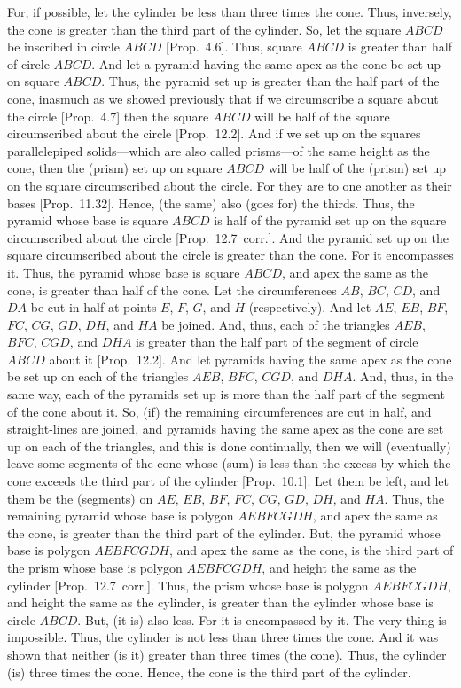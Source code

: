 \begin{Parallel}{}{}
{For, if possible, let the cylinder be less than three times the cone. Thus, inversely, the cone is greater than the third
part of the cylinder. So, let the square $ABCD$ be inscribed in circle $ABCD$  [Prop.~4.6]. Thus, square $ABCD$ is greater
than half of circle $ABCD$. 
And let a pyramid having the same apex as the cone be set up on square  $ABCD$. Thus, the pyramid set up
is greater than the half part of the cone, inasmuch as we showed previously that if we circumscribe a square
about the circle [Prop.~4.7] then the square $ABCD$ will be half of the square circumscribed about the circle [Prop.~12.2]. And if we set up   on the squares parallelepiped solids---which are also
called prisms---of the same height as the cone, then the (prism) set up on square $ABCD$ will be half of the (prism) set up on the square circumscribed
about the circle. For they are to one another as their bases [Prop.~11.32]. Hence, (the same) also (goes for) the thirds.  Thus, the pyramid whose base is square $ABCD$ is half of the pyramid set up on the square
circumscribed about the circle [Prop.~12.7~corr.]. And the pyramid set up on the square
circumscribed about the circle is greater than the cone. For it encompasses it. Thus, the pyramid whose
base is square $ABCD$, and apex the same as the cone, is greater than half of the cone. Let the circumferences $AB$,
$BC$, $CD$, and $DA$ be cut in half at points $E$, $F$, $G$, and $H$ (respectively).  And let $AE$, $EB$, $BF$,
$FC$, $CG$, $GD$, $DH$, and $HA$ be joined. And, thus, each of the triangles $AEB$, $BFC$,
$CGD$, and $DHA$ is greater than the half part of the segment of circle $ABCD$ about it [Prop.~12.2].
And let pyramids having the same apex as the cone be set up on each of the triangles $AEB$,
$BFC$, $CGD$, and $DHA$. And, thus, in the same way, each of the pyramids set up is more than the  half part of
the segment of the cone about it. So, (if) the remaining circumferences are cut in half, and straight-lines
are joined, and pyramids having the same apex as the cone are set up on each of the triangles, and this is
done continually, then we will (eventually) leave some segments of the cone 
whose (sum) is less than
the excess by which the cone exceeds the third part of the cylinder [Prop.~10.1]. 
Let them be left, and let them be the (segments) on $AE$, $EB$, $BF$, $FC$, $CG$, $GD$,
$DH$, and $HA$. Thus, the remaining pyramid whose base is polygon $AEBFCGDH$, and apex the
same as the cone, is greater than the third part of the cylinder. But, the pyramid whose base is
polygon $AEBFCGDH$, and apex the same as the cone, is the third part of the prism whose base
is polygon $AEBFCGDH$, and height the same as the cylinder [Prop.~12.7~corr.].
Thus, the prism whose base is polygon $AEBFCGDH$, and height the same as the cylinder, is greater than
the cylinder whose base is circle $ABCD$. But, (it is) also less. For it is encompassed by it. The very thing
is impossible. Thus, the cylinder is not less than three times the cone. And it was shown that neither (is it)
greater than three times (the cone). Thus, the cylinder (is) three times the cone. Hence, the cone is the
third part of the cylinder.

}
\end{Parallel}
